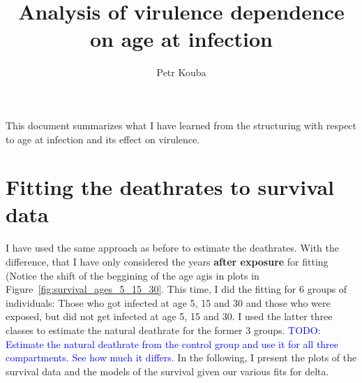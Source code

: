 \documentclass[10pt]{article}         %
\title{Analysis of virulence dependence on age at infection}
\author{Petr Kouba}
\begin{document}
\maketitle

This document summarizes what I have learned from the structuring with respect to age at infection and its effect on virulence.
\newpage
\section{Fitting the deathrates to survival data}

I have used the same approach as before to estimate the deathrates. With the difference, that I have only considered the years \textbf{after exposure} for fitting (Notice the shift of the beggining of the age agis in plots in Figure~\ref{fig:survival_ages_5_15_30}. This time, I did the fitting for 6 groups of individuals: Those who got infected at age 5, 15 and 30 and those who were exposed, but did not get infected at age 5, 15 and 30. I used the latter three classes to estimate the natural deathrate for the former 3 groups.
\newline\newline
\textcolor{blue}{TODO: Estimate the natural deathrate from the control group and use it for all three compartments. See how much it differs.}
\newline\newline
In the following, I present the plots of the survival data and the models of the survival given our various fits for delta.
\end{document}
